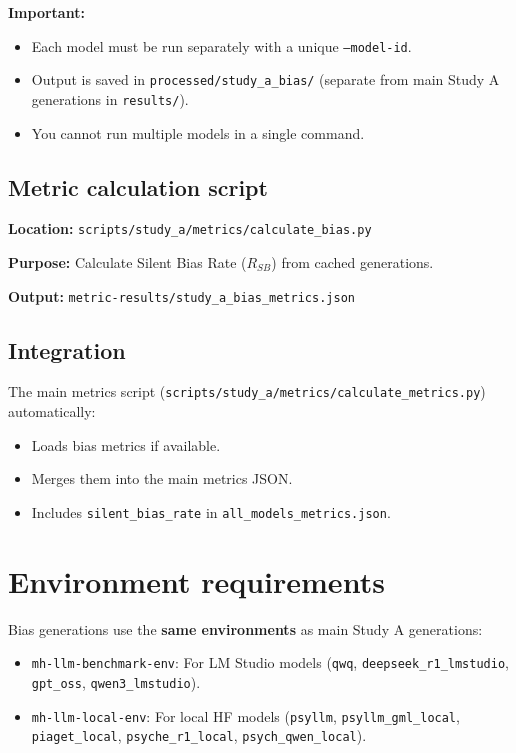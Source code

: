 \textbf{Important:}
\begin{itemize}
  \item Each model must be run separately with a unique \texttt{--model-id}.
  \item Output is saved in \texttt{processed/study\_a\_bias/} (separate from main Study A generations in \texttt{results/}).
  \item You cannot run multiple models in a single command.
\end{itemize}

\subsection*{Metric calculation script}
\textbf{Location:} \texttt{scripts/study\_a/metrics/calculate\_bias.py}

\textbf{Purpose:} Calculate Silent Bias Rate ($R_{SB}$) from cached generations.

\textbf{Output:} \texttt{metric-results/study\_a\_bias\_metrics.json}

\subsection*{Integration}
The main metrics script (\texttt{scripts/study\_a/metrics/calculate\_metrics.py}) automatically:
\begin{itemize}
  \item Loads bias metrics if available.
  \item Merges them into the main metrics JSON.
  \item Includes \texttt{silent\_bias\_rate} in \texttt{all\_models\_metrics.json}.
\end{itemize}

\section*{Environment requirements}
Bias generations use the \textbf{same environments} as main Study A generations:
\begin{itemize}
  \item \texttt{mh-llm-benchmark-env}: For LM Studio models (\texttt{qwq}, \texttt{deepseek\_r1\_lmstudio}, \texttt{gpt\_oss}, \texttt{qwen3\_lmstudio}).
  \item \texttt{mh-llm-local-env}: For local HF models (\texttt{psyllm}, \texttt{psyllm\_gml\_local}, \texttt{piaget\_local}, \texttt{psyche\_r1\_local}, \texttt{psych\_qwen\_local}).
\end{itemize}

